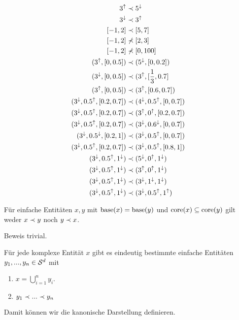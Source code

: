 \begin{bsp}
    \begin{align*}
        3^{\uparrow} &\prec 5^{\downarrow}\\
        3^{\downarrow} &\prec 3^{\uparrow}\\
        [-1,2] &\prec [5,7]\\
        [-1,2] &\nprec [2,3]\\
        [-1,2] &\nprec [0,100]\\
        (3^{\uparrow}, [0,0.5]) &\prec (5^{\downarrow}, [0,0.2])\\
        (3^{\downarrow}, [0,0.5]) &\prec (3^{\uparrow}, [\frac{1}{3}, 0.7]\\
        (3^{\uparrow}, [0,0.5]) &\prec (3^{\uparrow}, [0.6,0.7])\\
        (3^{\downarrow},0.5^{\uparrow},[0.2, 0.7]) &\prec (4^{\downarrow},0.5^{\uparrow},[0, 0.7])\\
        (3^{\downarrow},0.5^{\uparrow},[0.2, 0.7]) &\prec (3^{\uparrow},0^{\uparrow},[0.2, 0.7])\\
        (3^{\downarrow},0.5^{\uparrow},[0.2, 0.7]) &\prec (3^{\downarrow},0.6^{\downarrow},[0, 0.7])\\
        (3^{\downarrow},0.5^{\downarrow},[0.2, 1]) &\prec (3^{\downarrow},0.5^{\uparrow},[0, 0.7])\\
        (3^{\downarrow},0.5^{\uparrow},[0.2, 0.7]) &\prec (3^{\downarrow},0.5^{\uparrow},[0.8, 1])\\
        (3^{\downarrow},0.5^{\uparrow},1^{\downarrow}) &\prec (5^{\downarrow},0^{\uparrow},1^{\downarrow})\\
        (3^{\downarrow},0.5^{\uparrow},1^{\downarrow}) &\prec (3^{\uparrow},0^{\uparrow},1^{\downarrow})\\
        (3^{\downarrow},0.5^{\uparrow},1^{\downarrow}) &\prec (3^{\downarrow},1^{\downarrow},1^{\downarrow})\\
        (3^{\downarrow},0.5^{\uparrow},1^{\downarrow}) &\prec (3^{\downarrow},0.5^{\uparrow},1^{\uparrow})
    \end{align*}
\end{bsp}


\begin{satz}\label{satz:teil-nicht-vor}
    Für einfache Entitäten $x,y$ mit $\text{base}(x) = \text{base}(y)$ und $\text{core}(x) \subseteq
    \text{core}(y)$ gilt weder $x \prec y$ noch $y \prec x$.
\end{satz}
Beweis trivial.


Für jede komplexe Entität $x$ gibt es eindeutig bestimmte einfache Entitäten $y_1, ..., y_n \in \mathcal{S}^d$ mit
\begin{enumerate}
    \item $x = \bigcup_{i=1}^n y_i$.
    \item $y_1 \prec ... \prec y_n$
\end{enumerate}
Damit können wir die kanonische Darstellung definieren.

